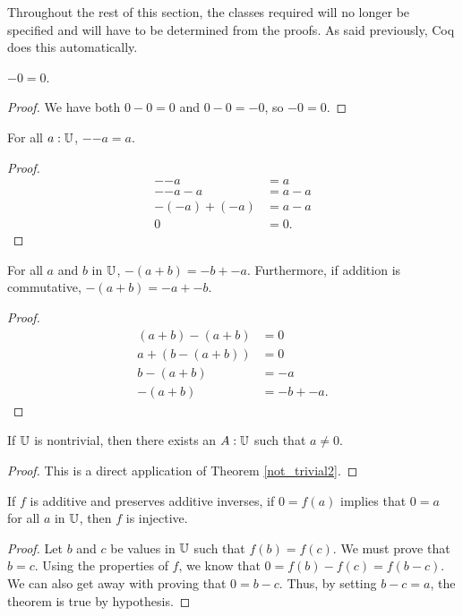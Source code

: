 \documentclass[../../math.tex]{subfiles}
\begin{document}
Throughout the rest of this section, the classes required will no longer be
specified and will have to be determined from the proofs.  As said previously,
Coq does this automatically.

\begin{theorem}
    $-0 = 0$.
\end{theorem}
\begin{proof}
    We have both $0 - 0 = 0$ and $0 - 0 = -0$, so $-0 = 0$.
\end{proof}

\begin{theorem}
    For all $a : \mathbb{U}$, $-{-a} = a$.
\end{theorem}
\begin{proof}
    \begin{align*}
        -{-a} &= a \\
        -{-a} - a &= a - a \\
        -(-a) + (-a) &= a - a \\
        0 &= 0.
    \end{align*}
\end{proof}

\begin{theorem} \label{neg_plus}
    For all $a$ and $b$ in $\mathbb{U}$, $-(a + b) = -b + -a$.  Furthermore, if addition
    is commutative, $-(a + b) = -a + -b$.
\end{theorem}
\begin{proof}
    \begin{align*}
        (a + b) - (a + b) &= 0 \\
        a + (b - (a + b)) &= 0 \\
        b - (a + b) &= -a \\
        -(a + b) &= -b + -a.
    \end{align*}
\end{proof}

\begin{theorem} \label{not_trivial_zero}
    If $\mathbb{U}$ is nontrivial, then there exists an $A : \mathbb{U}$ such that $a \neq 0$.
\end{theorem}
\begin{proof}
    This is a direct application of Theorem \ref{not_trivial2}.
\end{proof}

\begin{theorem} \label{homo_zero_inj}
    If $f$ is additive and preserves additive inverses, if $0 = f(a)$ implies
    that $0 = a$ for all $a$ in $\mathbb{U}$, then $f$ is injective.
\end{theorem}
\begin{proof}
    Let $b$ and $c$ be values in $\mathbb{U}$ such that $f(b) = f(c)$.  We must prove
    that $b = c$.  Using the properties of $f$, we know that $0 = f(b) - f(c) =
    f(b - c)$.  We can also get away with proving that $0 = b - c$.  Thus, by
    setting $b - c = a$, the theorem is true by hypothesis.
\end{proof}
\end{document}
